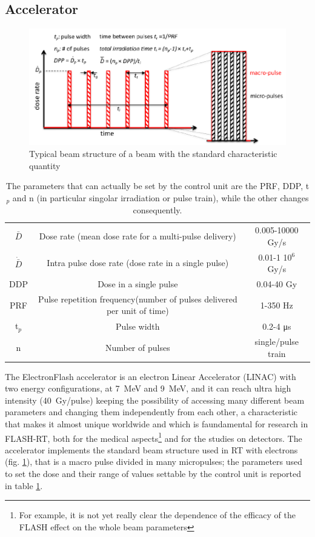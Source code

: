    \subsection{Accelerator}
      \begin{figure}
         \centering
         \includegraphics[width=.9\linewidth]{figures/test_beam/beam_structure.pdf}
         \caption{Typical beam structure of a beam with the standard characteristic quantity}
         \label{fig:beam_structure}
      \end{figure}
      \begin{table}
         \begin{center}
         \begin{tabular}{| c | c | c |}
         \hline
      $\bar{D}$ & Dose rate (mean dose rate for a multi-pulse delivery) & 0.005-10000 Gy/s\\
      $\Dot{\bar{D}}$ & Intra pulse dose rate (dose rate in a single pulse) &  0.01-1 10$^6$ Gy/s  \\
      DDP & Dose in a single pulse & 0.04-40 Gy\\
      PRF & Pulse repetition frequency(number of pulses delivered per unit of time) & 1-350 Hz\\
      t$_{p}$ & Pulse width & 0.2-4 \si{\us}\\
      n & Number of pulses & single/pulse train \\
      \hline
         \end{tabular}
         \caption{The parameters that can actually be set by the control unit are the PRF, DDP, t$_p$ and n (in particular singolar irradiation or pulse train), while the other changes consequently.}
         \label{tab:beam_parameters}
         \end{center}
      \end{table}  
      The ElectronFlash accelerator is an electron Linear Accelerator (LINAC) with two energy configurations, at \SI{7}{MeV} and \SI{9}{MeV}, and it can reach ultra high intensity (\SI{40}{Gy/pulse}) keeping the possibility of accessing many different beam parameters and changing them independently from each other, a characteristic that makes it almost unique worldwide and which is faundamental for research in FLASH-RT, both for the medical aspects\footnote{For example, it is not yet really clear the dependence of the efficacy of the FLASH effect on the whole beam parameters} and for the studies on detectors. 
      The accelerator implements the standard beam structure used in RT with electrons (fig. \ref{fig:beam_structure}), that is a macro pulse divided in many micropulses; the parameters used to set the dose and their range of values settable by the control unit is reported in table \ref{tab:beam_parameters}. 

